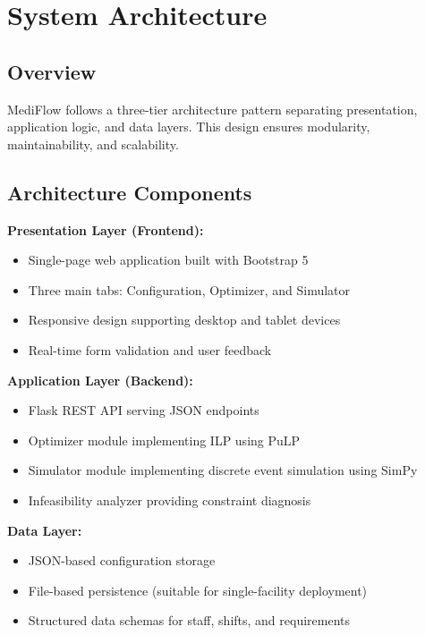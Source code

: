 \documentclass[12pt,a4paper]{article}
\begin{document}
\section{System Architecture}
\label{sec:architecture}

\subsection{Overview}
\label{subsec:arch-overview}

MediFlow follows a three-tier architecture pattern separating presentation, application logic, and data layers. This design ensures modularity, maintainability, and scalability.

\vspace{0.5em}

\subsection{Architecture Components}

\textbf{Presentation Layer (Frontend):}
\begin{itemize}
    \item Single-page web application built with Bootstrap 5
    \item Three main tabs: Configuration, Optimizer, and Simulator
    \item Responsive design supporting desktop and tablet devices
    \item Real-time form validation and user feedback
\end{itemize}

\textbf{Application Layer (Backend):}
\begin{itemize}
    \item Flask REST API serving JSON endpoints
    \item Optimizer module implementing ILP using PuLP
    \item Simulator module implementing discrete event simulation using SimPy
    \item Infeasibility analyzer providing constraint diagnosis
\end{itemize}

\textbf{Data Layer:}
\begin{itemize}
    \item JSON-based configuration storage
    \item File-based persistence (suitable for single-facility deployment)
    \item Structured data schemas for staff, shifts, and requirements
\end{itemize}
\end{document}
